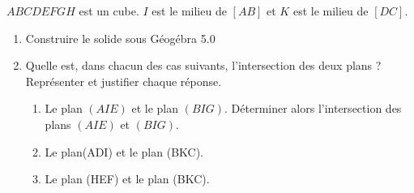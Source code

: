 
$ABCDEFGH$ est un cube. $I$ est le milieu de $[AB]$ et $K$ est le milieu de $[DC]$.

\begin{enumerate}
\item Construire le solide sous Géogébra 5.0

\item Quelle est, dans chacun des cas suivants, l'intersection des deux plans  ? Représenter et justifier chaque réponse.

\begin{enumerate}
\item  Le plan $(AIE)$ et le plan $(BIG)$. Déterminer alors l'intersection des plans $(AIE)$ et $(BIG)$.
\item  Le plan(ADI) et le plan (BKC).
\item  Le plan (HEF) et le plan (BKC).
\end{enumerate}

\end{enumerate}